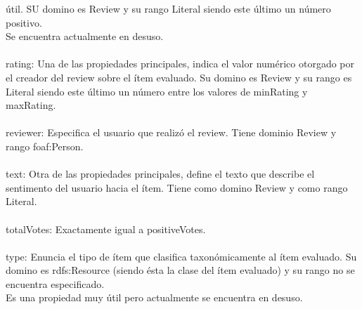 útil. SU domino es Review y su rango Literal siendo este último un número positivo.\\
Se encuentra actualmente en desuso.\\
\\
rating: Una de las propiedades principales, indica el valor numérico otorgado por el creador del review sobre el ítem evaluado. 
Su domino es Review y su rango es Literal siendo este último un número entre los valores de minRating y maxRating.\\
\\
reviewer: Especifica el usuario que realizó el review. Tiene dominio Review y rango foaf:Person. \\
\\
text: Otra de las propiedades principales, define el texto que describe el sentimento del usuario hacia el ítem. Tiene como 
domino Review y como rango Literal.\\
\\
totalVotes: Exactamente igual a positiveVotes.\\
\\
type: Enuncia el tipo de ítem que clasifica taxonómicamente al ítem evaluado. Su domino es rdfs:Resource (siendo ésta la clase del ítem evaluado)  
y su rango no se encuentra especificado. \\
Es una propiedad muy útil pero actualmente se encuentra en desuso.\\
\\

